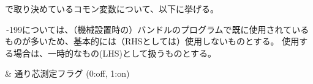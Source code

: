 
\DMname で取り決めているコモン変数について、以下に挙げる。



\,-\pcrNum199については、（機械設置時の）バンドルのプログラムで既に使用されているものが多いため、基本的には（RHSとしては）使用しないものとする。
使用する場合は、一時的なもの(LHS)として扱うものとする。\\
\begin{twoCtable}{}
 & 通り芯測定フラグ (0:off, 1:on)
\end{twoCtable}




